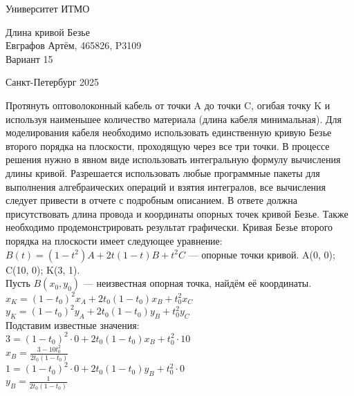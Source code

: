 


\thispagestyle{empty}
\begin{center}
\LARGE{Университет ИТМО} 
\vspace{20pt}

\vspace{180pt}

\LARGE{Длина кривой Безье\\
Евграфов Артём, 465826, P3109\\ 
Вариант 15 \\}
\vspace{335pt}
\end{center}

\begin{center}
\Large{Санкт-Петербург 2025}
\end{center}

\newpage
\setcounter{page}{1}
\noindent Протянуть оптоволоконный кабель от точки A до точки C, огибая точку K и используя наименьшее количество материала (длина кабеля минимальная). Для моделирования кабеля необходимо использовать единственную кривую Безье второго порядка на плоскости, проходящую через все три точки. В процессе решения нужно в явном виде использовать интегральную формулу вычисления длины кривой. Разрешается использовать любые программные пакеты для выполнения алгебраических операций и взятия интегралов, все вычисления следует привести в отчете с подробным описанием. В ответе должна присутствовать длина провода и координаты опорных точек кривой Безье. Также необходимо продемонстрировать результат графически. Кривая Безье второго порядка на плоскости имеет следующее уравнение: \\
\(B(t) = (1-t^2)A + 2t(1-t)B+t^2C\) — опорные точки кривой. A(0, 0); C(10, 0); K(3, 1). \\

\noindent Пусть $B(x_0, y_0)$ — неизвестная опорная точка, найдём её координаты. \\
\(x_K = (1-t_0)^2 x_A + 2t_0(1-t_0) x_B + t_0^2 x_C\) \\
\(y_K = (1-t_0)^2 y_A + 2t_0(1-t_0) y_B + t_0^2 y_C\) \\

\noindent Подставим известные значения: \\
\(3 = (1-t_0)^2 \cdot 0 + 2t_0(1-t_0) x_B + t_0^2 \cdot 10\) \\
\(x_B = \frac{3 - 10t_0^2}{2t_0(1-t_0)}\) \\

\noindent \(1 = (1-t_0)^2 \cdot 0 + 2t_0(1-t_0) y_B + t_0^2 \cdot 0\) \\
\(y_B = \frac{1}{2t_0(1-t_0)}\) \\

